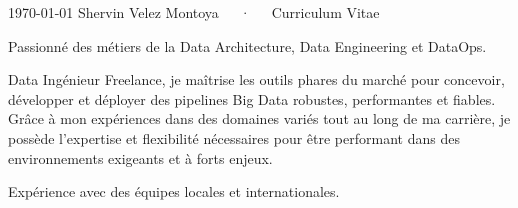 \documentclass[11pt, a4paper]{awesome-cv}
\begin{document}
\makecvheader

\makecvfooter
{\today}
{Shervin Velez Montoya~~~·~~~Curriculum Vitae}
{}


\begin{cvparagraph}
    Passionné des métiers de la Data Architecture, Data Engineering et DataOps.
    
    Data Ingénieur Freelance, je maîtrise les outils phares du marché pour concevoir, développer et déployer des pipelines Big Data robustes, performantes et fiables. Grâce à mon expériences dans des domaines variés tout au long de ma carrière,
    je possède l'expertise et flexibilité nécessaires pour être performant dans des environnements exigeants et à forts enjeux.

    Expérience avec des équipes locales et internationales.
\end{cvparagraph}





\end{document}
